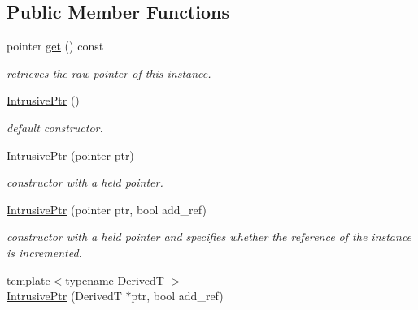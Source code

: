 \subsection*{Public Member Functions}
\begin{DoxyCompactItemize}
\item 
\hypertarget{classhryky_1_1_intrusive_ptr_a876dbe10311099aba912f8cfa3fd635b}{pointer \hyperlink{classhryky_1_1_intrusive_ptr_a876dbe10311099aba912f8cfa3fd635b}{get} () const }\label{classhryky_1_1_intrusive_ptr_a876dbe10311099aba912f8cfa3fd635b}

\begin{DoxyCompactList}\small\item\em retrieves the raw pointer of this instance. \end{DoxyCompactList}\item 
\hypertarget{classhryky_1_1_intrusive_ptr_a8294a613bfbc752216fd26fe77d4aaf9}{\hyperlink{classhryky_1_1_intrusive_ptr_a8294a613bfbc752216fd26fe77d4aaf9}{Intrusive\-Ptr} ()}\label{classhryky_1_1_intrusive_ptr_a8294a613bfbc752216fd26fe77d4aaf9}

\begin{DoxyCompactList}\small\item\em default constructor. \end{DoxyCompactList}\item 
\hypertarget{classhryky_1_1_intrusive_ptr_a4e4600e5ff84aa875f1479c4a364583f}{\hyperlink{classhryky_1_1_intrusive_ptr_a4e4600e5ff84aa875f1479c4a364583f}{Intrusive\-Ptr} (pointer ptr)}\label{classhryky_1_1_intrusive_ptr_a4e4600e5ff84aa875f1479c4a364583f}

\begin{DoxyCompactList}\small\item\em constructor with a held pointer. \end{DoxyCompactList}\item 
\hypertarget{classhryky_1_1_intrusive_ptr_a55a0a47960f5a8f033c2794e25b91548}{\hyperlink{classhryky_1_1_intrusive_ptr_a55a0a47960f5a8f033c2794e25b91548}{Intrusive\-Ptr} (pointer ptr, bool add\-\_\-ref)}\label{classhryky_1_1_intrusive_ptr_a55a0a47960f5a8f033c2794e25b91548}

\begin{DoxyCompactList}\small\item\em constructor with a held pointer and specifies whether the reference of the instance is incremented. \end{DoxyCompactList}\item 
\hypertarget{classhryky_1_1_intrusive_ptr_ae2f947d01984f4e16ec59ce529be4a8e}{{\footnotesize template$<$typename Derived\-T $>$ }\\\hyperlink{classhryky_1_1_intrusive_ptr_ae2f947d01984f4e16ec59ce529be4a8e}{Intrusive\-Ptr} (Derived\-T $\ast$ptr, bool add\-\_\-ref)}\label{classhryky_1_1_intrusive_ptr_ae2f947d01984f4e16ec59ce529be4a8e}


\end{DoxyCompactItemize}
